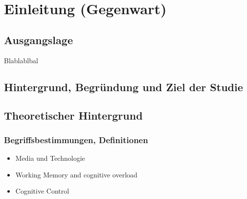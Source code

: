 %
%
\glsresetall %
\let\raggedsection\centering 
\chapter{Einleitung (Gegenwart)}\label{chap.einleitung}
\let\raggedsection\raggedright 

\section{Ausgangslage}\label{section.ausgangslage}
Blablablbal

\section{Hintergrund, Begründung und Ziel der Studie}\label{section.hintergrund}
\section{Theoretischer Hintergrund}\label{section.theoHintegrund}
\subsection{Begriffsbestimmungen, Definitionen}
\label{subsection.begriffsbestimmung}
\begin{itemize}
    \item Media und Technologie \cite{Lin20091}
    \item Working Memory \cite{Mayer2003} and cognitive overload
    \item Cognitive Control
\end{itemize}

